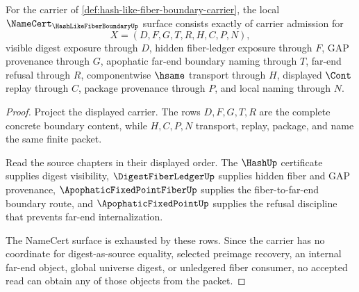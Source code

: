 \begin{theorem}
\label{thm:hash-like-fiber-boundary-namecert-obligations}
For the carrier of \autoref{def:hash-like-fiber-boundary-carrier}, the local
$\NameCert_{\HashLikeFiberBoundaryUp}$ surface consists exactly of carrier
admission for
$$
X=(D,F,G,T,R,H,C,P,N),
$$
visible digest exposure through $D$, hidden fiber-ledger exposure through $F$,
GAP provenance through $G$, apophatic far-end boundary naming through $T$,
far-end refusal through $R$, componentwise $\hsame$ transport through $H$,
displayed $\Cont$ replay through $C$, package provenance through $P$, and local
naming through $N$.
\end{theorem}
\begin{proof}
Project the displayed carrier. The rows $D,F,G,T,R$ are the complete concrete
boundary content, while $H,C,P,N$ transport, replay, package, and name the same
finite packet.

Read the source chapters in their displayed order. The $\HashUp$ certificate
supplies digest visibility, $\DigestFiberLedgerUp$ supplies hidden fiber and
GAP provenance, $\ApophaticFixedPointFiberUp$ supplies the fiber-to-far-end
boundary route, and $\ApophaticFixedPointUp$ supplies the refusal discipline
that prevents far-end internalization.

The NameCert surface is exhausted by these rows. Since the carrier has no
coordinate for digest-as-source equality, selected preimage recovery, an
internal far-end object, global universe digest, or unledgered fiber consumer,
no accepted read can obtain any of those objects from the packet.
\end{proof}

